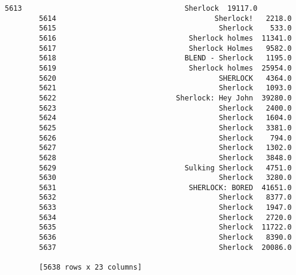 \documentclass[11pt]{article}
\begin{document}
\begin{Verbatim}[commandchars=\\\{\}]
        5613                                      Sherlock  19117.0  
        5614                                     Sherlock!   2218.0  
        5615                                      Sherlock    533.0  
        5616                               Sherlock holmes  11341.0  
        5617                               Sherlock Holmes   9582.0  
        5618                              BLEND - Sherlock   1195.0  
        5619                               Sherlock holmes  25954.0  
        5620                                      SHERLOCK   4364.0  
        5621                                      Sherlock   1093.0  
        5622                            Sherlock: Hey John  39280.0  
        5623                                      Sherlock   2400.0  
        5624                                      Sherlock   1604.0  
        5625                                      Sherlock   3381.0  
        5626                                      Sherlock    794.0  
        5627                                      Sherlock   1302.0  
        5628                                      Sherlock   3848.0  
        5629                              Sulking Sherlock   4751.0  
        5630                                      Sherlock   3280.0  
        5631                               SHERLOCK: BORED  41651.0  
        5632                                      Sherlock   8377.0  
        5633                                      Sherlock   1947.0  
        5634                                      Sherlock   2720.0  
        5635                                      Sherlock  11722.0  
        5636                                      Sherlock   8390.0  
        5637                                      Sherlock  20086.0  
        
        [5638 rows x 23 columns]
\end{Verbatim}
            

    
    
    
    
\end{document}
